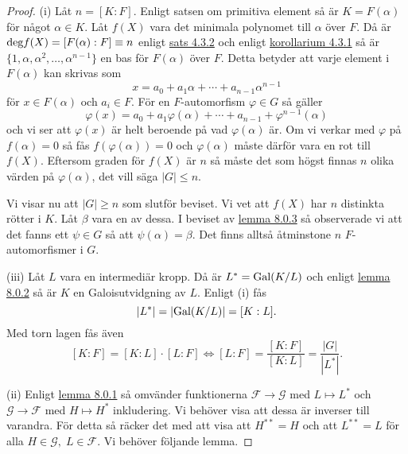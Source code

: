 \documentclass{article}
\newcommand{\grad}[0]{\textnormal{deg}}
\newcommand{\gal}[0]{\textnormal{Gal}}
\theoremstyle{definition}
\begin{document}
\begin{proof}
  (i) Låt $n = [K:F]$. Enligt satsen om primitiva element så är $K = F(\alpha)$ för något $\alpha \in K.$ Låt $f(X)$ vara det minimala polynomet 
  till $\alpha$ över $F$. Då är $\grad f(X) = [F(\alpha):F] \equiv n$ enligt \hyperlink{5.3.2}{sats 4.3.2} och enligt \hyperlink{kol5.3.1}{korollarium 4.3.1} så är 
  $\{1, \alpha, \alpha^2, \ldots, \alpha^{n-1}\}$ en bas för $F(\alpha)$ över $F$. Detta betyder att varje element i 
  $F(\alpha)$ kan skrivas som 
  \[ x = a_0 + a_1 \alpha + \cdots + a_{n-1} \alpha^{n-1}\]
  för $x \in F(\alpha)$ och $a_i \in F$. För en $F$-automorfism $\varphi \in G$ så gäller 
  \[ \varphi(x) = a_0 + a_1 \varphi(\alpha) + \cdots + a_{n-1} + \varphi^{n-1}(\alpha)\]
  och vi ser att $\varphi(x)$ är helt beroende på vad $\varphi(\alpha)$ är. Om vi 
  verkar med $\varphi$ på $f(\alpha) = 0$ så fås $f(\varphi(\alpha)) = 0$ och $\varphi(\alpha)$ måste därför vara en rot till $f(X)$.
  Eftersom graden för $f(X)$ är $n$ så måste det som högst finnas $n$ olika värden på $\varphi(\alpha)$, det vill säga
  $|G| \leq n$.

  Vi visar nu att $|G| \geq n$ som slutför beviset. Vi vet att $f(X)$ har $n$ distinkta rötter i $K$. Låt $\beta$ vara en av dessa.
  I beviset av \hyperlink{lemma9.0.3}{lemma 8.0.3} så observerade vi att det fanns ett $\psi \in G$ så att $\psi(\alpha) = \beta.$
  Det finns alltså åtminstone $n$ $F$-automorfismer i $G$. 

  (iii) Låt $L$ vara en intermediär kropp. Då är $L^* = \gal(K/L)$ och enligt \hyperlink{lemma9.0.2}{lemma 8.0.2} så är $K$ en Galoisutvidgning av $L$.
  Enligt (i) fås 
  \[|L^*| = |\gal(K/L)| = [K:L]. \]
  Med torn lagen fås även
  \[ [K:F] = [K:L] \cdot [L:F] \iff [L:F] = \frac{ [K:F] }{ [K:L] } = \frac{|G|}{|L^*|}. \]

  (ii) Enligt \hyperlink{lemma9.0.1}{lemma 8.0.1} så omvänder funktionerna $\mathcal{F} \rightarrow \mathcal{G}$ med $L \mapsto L^*$ och
  $\mathcal{G} \rightarrow \mathcal{F}$ med $H \mapsto H^*$ inkludering. Vi behöver visa att dessa är inverser till varandra.
  För detta så räcker det med att visa att $H^{**} = H$ och att $L^{**} = L$ för alla $H \in \mathcal{G}, \; L \in \mathcal{F}$.
  Vi behöver följande lemma.


\end{proof}
\end{document}
